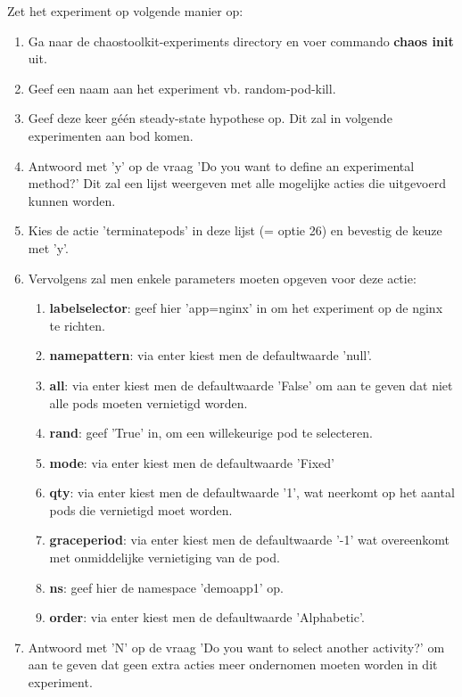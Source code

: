 Zet het experiment op volgende manier op:  
\begin{enumerate}
    \item Ga naar de chaostoolkit-experiments directory en voer commando {\bf chaos init} uit.
    \item Geef een naam aan het experiment vb. random-pod-kill.
    \item Geef deze keer géén steady-state hypothese op. Dit zal in volgende experimenten aan bod komen.
    \item Antwoord met 'y' op de vraag 'Do you want to define an experimental method?' Dit zal een lijst weergeven met alle mogelijke acties die uitgevoerd kunnen worden. 
    \item Kies de actie 'terminate\textunderscore pods' in deze lijst (= optie 26) en bevestig de keuze met 'y'. 
    \item Vervolgens zal men enkele parameters moeten opgeven voor deze actie: 
    \begin{enumerate}
        \item {\bf label\textunderscore selector}: geef hier 'app=nginx' in om het experiment op de nginx te richten.
        \item {\bf name\textunderscore pattern}: via enter kiest men de defaultwaarde 'null'.
        \item {\bf all}: via enter kiest men de defaultwaarde 'False' om aan te geven dat niet alle pods moeten vernietigd worden.
        \item {\bf rand}: geef 'True' in, om een willekeurige pod te selecteren.
        \item {\bf mode}: via enter kiest men de defaultwaarde 'Fixed'
        \item {\bf qty}: via enter kiest men de defaultwaarde '1', wat neerkomt op het aantal pods die vernietigd moet worden.
        \item {\bf grace\textunderscore period}: via enter kiest men de defaultwaarde '-1' wat overeenkomt met onmiddelijke vernietiging van de pod.
        \item {\bf ns}: geef hier de namespace 'demoapp1' op.
        \item {\bf order}: via enter kiest men de defaultwaarde 'Alphabetic'.
    \end{enumerate}
    \item Antwoord met 'N' op de vraag 'Do you want to select another activity?' om aan te geven dat geen extra acties meer ondernomen moeten worden in dit experiment.
\end{enumerate} 

